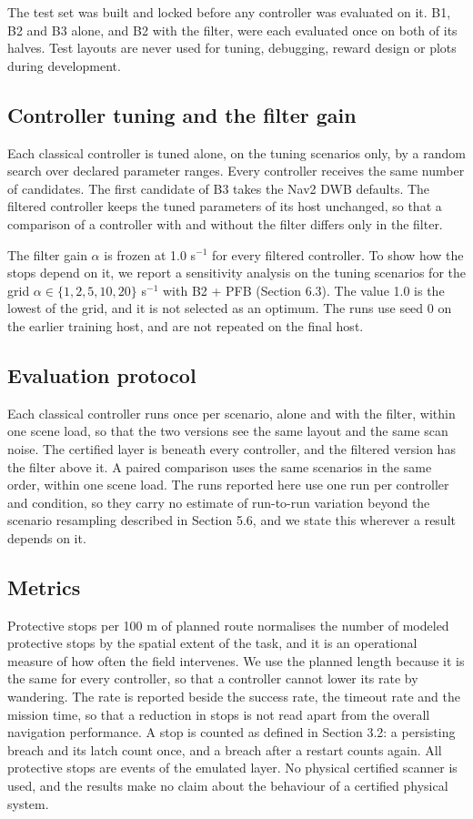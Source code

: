 The test set was built and locked before any controller was evaluated on it. B1, B2 and B3 alone, and B2 with the filter, were each evaluated once on both of its halves. Test layouts are never used for tuning, debugging, reward design or plots during development.

\subsection{Controller tuning and the filter gain}

Each classical controller is tuned alone, on the tuning scenarios only, by a random search over declared parameter ranges. Every controller receives the same number of candidates. The first candidate of B3 takes the Nav2 DWB defaults. The filtered controller keeps the tuned parameters of its host unchanged, so that a comparison of a controller with and without the filter differs only in the filter.

The filter gain $\alpha$ is frozen at 1.0 s$^{-1}$ for every filtered controller. To show how the stops depend on it, we report a sensitivity analysis on the tuning scenarios for the grid $\alpha \in \{1, 2, 5, 10, 20\}$ s$^{-1}$ with B2 + PFB (Section 6.3). The value 1.0 is the lowest of the grid, and it is not selected as an optimum. The runs use seed 0 on the earlier training host, and are not repeated on the final host.

\subsection{Evaluation protocol}

Each classical controller runs once per scenario, alone and with the filter, within one scene load, so that the two versions see the same layout and the same scan noise. The certified layer is beneath every controller, and the filtered version has the filter above it. A paired comparison uses the same scenarios in the same order, within one scene load. The runs reported here use one run per controller and condition, so they carry no estimate of run-to-run variation beyond the scenario resampling described in Section 5.6, and we state this wherever a result depends on it.

\subsection{Metrics}

Protective stops per 100 m of planned route normalises the number of modeled protective stops by the spatial extent of the task, and it is an operational measure of how often the field intervenes. We use the planned length because it is the same for every controller, so that a controller cannot lower its rate by wandering. The rate is reported beside the success rate, the timeout rate and the mission time, so that a reduction in stops is not read apart from the overall navigation performance. A stop is counted as defined in Section 3.2: a persisting breach and its latch count once, and a breach after a restart counts again. All protective stops are events of the emulated layer. No physical certified scanner is used, and the results make no claim about the behaviour of a certified physical system.

